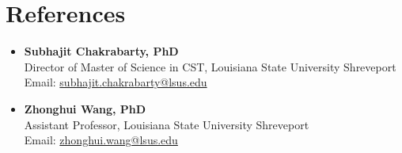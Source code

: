\documentclass[letterpaper,11pt]{article}
\begin{document}
\section{References}
\begin{itemize}[leftmargin=*]
  \item \textbf{Subhajit Chakrabarty, PhD} \\
    Director of Master of Science in CST, Louisiana State University Shreveport \\
    Email: \href{mailto:subhajit.chakrabarty@lsus.edu}{subhajit.chakrabarty@lsus.edu}
  \item \textbf{Zhonghui Wang, PhD} \\
    Assistant Professor, Louisiana State University Shreveport \\
    Email: \href{mailto:zhonghui.wang@lsus.edu}{zhonghui.wang@lsus.edu}
\end{itemize}
\end{document}
